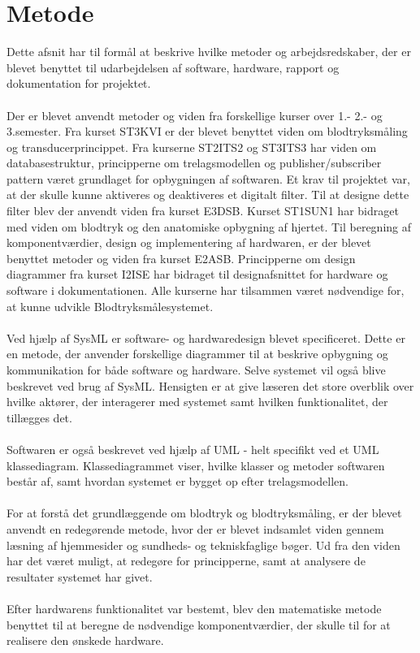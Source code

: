 \section{Metode}
Dette afsnit har til formål at beskrive hvilke metoder og arbejdsredskaber, der er blevet benyttet til udarbejdelsen af software, hardware, rapport og dokumentation for projektet. 
\\\\
Der er blevet anvendt metoder og viden fra forskellige kurser over 1.- 2.- og 3.semester. Fra kurset ST3KVI er der blevet benyttet viden om blodtryksmåling og transducerprincippet. Fra kurserne ST2ITS2 og ST3ITS3 har viden om databasestruktur, principperne om trelagsmodellen og publisher/subscriber pattern været grundlaget for opbygningen af softwaren. Et krav til projektet var, at der skulle kunne aktiveres og deaktiveres et digitalt filter. Til at designe dette filter blev der anvendt viden fra kurset E3DSB. Kurset ST1SUN1 har bidraget med viden om blodtryk og den anatomiske opbygning af hjertet. Til beregning af komponentværdier, design og implementering af hardwaren, er der blevet benyttet metoder og viden fra kurset E2ASB. Principperne om design diagrammer fra kurset I2ISE har bidraget til designafsnittet for hardware og software i dokumentationen. Alle kurserne har tilsammen været nødvendige for, at kunne udvikle Blodtryksmålesystemet.
\\\\
Ved hjælp af SysML er software- og hardwaredesign blevet specificeret. Dette er en metode, der anvender forskellige diagrammer til at beskrive opbygning og kommunikation for både software og hardware. Selve systemet vil også blive beskrevet ved brug af SysML. Hensigten er at give læseren det store overblik over hvilke aktører, der interagerer med systemet samt hvilken funktionalitet, der tillægges det. 
\\ \\
Softwaren er også beskrevet ved hjælp af UML - helt specifikt ved et UML klassediagram. Klassediagrammet viser, hvilke klasser og metoder softwaren består af, samt hvordan systemet er bygget op efter trelagsmodellen.
\\\\
For at forstå det grundlæggende om blodtryk og blodtryksmåling, er der blevet anvendt en redegørende metode, hvor der er blevet indsamlet viden gennem læsning af hjemmesider og sundheds- og tekniskfaglige bøger. Ud fra den viden har det været muligt, at redegøre for principperne, samt at analysere de resultater systemet har givet.
\\\\
Efter hardwarens funktionalitet var bestemt, blev den matematiske metode benyttet til at beregne de nødvendige komponentværdier, der skulle til for at realisere den ønskede hardware.

